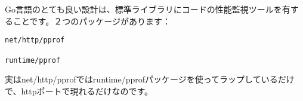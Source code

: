Go言語のとても良い設計は、標準ライブラリにコードの性能監視ツールを有することです。２つのパッケージがあります：

\begin{lstlisting}[numbers=none]
net/http/pprof

runtime/pprof
\end{lstlisting}


実はnet/http/pprofではruntime/pprofパッケージを使ってラップしているだけで、httpポートで現れるだけなのです。
